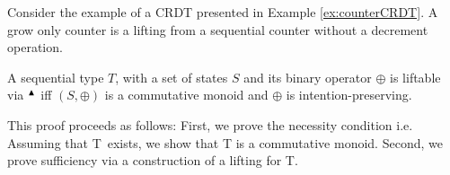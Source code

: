 
Consider the example of a CRDT presented in Example \ref{ex:counterCRDT}. 
A grow only counter is a lifting from a sequential counter without a decrement operation. 


\begin{theorem}
  A sequential type $T$, with a set of states $S$ and its binary operator $\oplus$ is liftable via  ${}^{\blacktriangle}{}$ iff $(S, \oplus)$ is a commutative monoid and $\oplus$ is intention-preserving.
\end{theorem}
This proof proceeds as follows: 
First, we prove the necessity condition i.e. Assuming that T\R ~exists, we show that T is a commutative monoid. 
Second, we prove sufficiency via a construction of a lifting for T\R.

